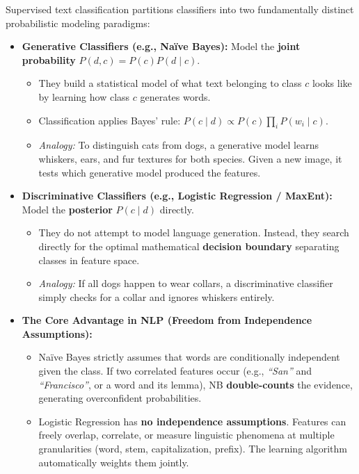 \documentclass[10pt,a4paper]{article}
\begin{document}
\par\vspace{1pt}
Supervised text classification partitions classifiers into two fundamentally distinct probabilistic modeling paradigms:
\begin{itemize}[leftmargin=12pt, itemsep=0.5pt, parsep=0pt, topsep=0.5pt]
    \item \textbf{Generative Classifiers (e.g., Naïve Bayes):} Model the \textbf{joint probability} $P(d, c) = P(c)P(d \mid c)$.
    \begin{itemize}[leftmargin=12pt, itemsep=0.5pt, parsep=0pt]
        \item They build a statistical model of what text belonging to class $c$ looks like by learning how class $c$ generates words.
        \item Classification applies Bayes' rule: $P(c \mid d) \propto P(c) \prod_{i} P(w_i \mid c)$.
        \item \textit{Analogy:} To distinguish cats from dogs, a generative model learns whiskers, ears, and fur textures for both species. Given a new image, it tests which generative model produced the features.
    \end{itemize}
    \item \textbf{Discriminative Classifiers (e.g., Logistic Regression / MaxEnt):} Model the \textbf{posterior} $P(c \mid d)$ directly.
    \begin{itemize}[leftmargin=12pt, itemsep=0.5pt, parsep=0pt]
        \item They do not attempt to model language generation. Instead, they search directly for the optimal mathematical \textbf{decision boundary} separating classes in feature space.
        \item \textit{Analogy:} If all dogs happen to wear collars, a discriminative classifier simply checks for a collar and ignores whiskers entirely.
    \end{itemize}
    \item \textbf{The Core Advantage in NLP (Freedom from Independence Assumptions):}
    \begin{itemize}[leftmargin=12pt, itemsep=0.5pt, parsep=0pt]
        \item Naïve Bayes strictly assumes that words are conditionally independent given the class. If two correlated features occur (e.g., \textit{``San''} and \textit{``Francisco''}, or a word and its lemma), NB \textbf{double-counts} the evidence, generating overconfident probabilities.
        \item Logistic Regression has \textbf{no independence assumptions}. Features can freely overlap, correlate, or measure linguistic phenomena at multiple granularities (word, stem, capitalization, prefix). The learning algorithm automatically weights them jointly.
    \end{itemize}
\end{itemize}
\vspace{2pt}
\end{document}
